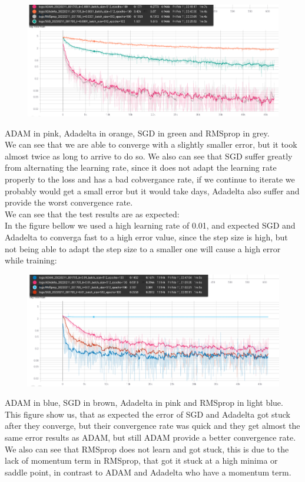 \documentclass[10pt,a4paper]{article}
\begin{document}
\begin{center}
    \includegraphics[width=15cm, height=5cm]{train_lr=0.0001_bs=512.png}
\end{center}
ADAM in pink, Adadelta in orange, SGD in green and RMSprop in grey.\\
We can see that we are able to converge with a slightly smaller error, but it took almost twice as long to arrive to do so. We also can see that SGD suffer greatly from alternating the learning rate, since it does not adapt the learning rate properly to the loss and has a bad cobvergance rate, if we continue to iterate we probably would get a small error but it would take days, Adadelta also suffer and provide the worst convergence rate.\\
We can see that the test results are as expected:
\\
In the figure bellow we used a high learning rate of 0.01, and expected SGD and Adadelta to converga fast to a high error value, since the step size is high, but not being able to adapt the step size to a smaller one will cause a high error while training:
\begin{center}
    \includegraphics[width=15cm, height=5cm]{train_lr=0.01_bs=512.png}
\end{center}
ADAM in blue, SGD in brown, Adadelta in pink and RMSprop in light blue.\\
This figure show us, that as expected the error of SGD and Adadelta got stuck after they converge, but their convergence rate was quick and they get almost the same error results as ADAM, but still ADAM provide a better convergence rate. We also can see that RMSprop does not learn and got stuck, this is due to the lack of momentum term in RMSprop, that got it stuck at a high minima or saddle point, in contrast to ADAM and Adadelta who have a momentum term.
\end{document}
